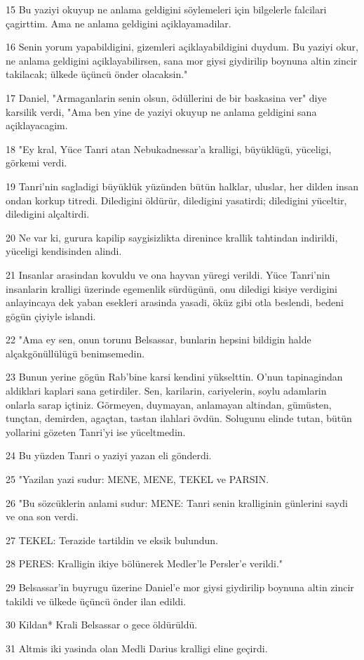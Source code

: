 \par 15 Bu yaziyi okuyup ne anlama geldigini söylemeleri için bilgelerle falcilari çagirttim. Ama ne anlama geldigini açiklayamadilar.
\par 16 Senin yorum yapabildigini, gizemleri açiklayabildigini duydum. Bu yaziyi okur, ne anlama geldigini açiklayabilirsen, sana mor giysi giydirilip boynuna altin zincir takilacak; ülkede üçüncü önder olacaksin."
\par 17 Daniel, "Armaganlarin senin olsun, ödüllerini de bir baskasina ver" diye karsilik verdi, "Ama ben yine de yaziyi okuyup ne anlama geldigini sana açiklayacagim.
\par 18 "Ey kral, Yüce Tanri atan Nebukadnessar'a kralligi, büyüklügü, yüceligi, görkemi verdi.
\par 19 Tanri'nin sagladigi büyüklük yüzünden bütün halklar, uluslar, her dilden insan ondan korkup titredi. Diledigini öldürür, diledigini yasatirdi; diledigini yüceltir, diledigini alçaltirdi.
\par 20 Ne var ki, gurura kapilip saygisizlikta direnince krallik tahtindan indirildi, yüceligi kendisinden alindi.
\par 21 Insanlar arasindan kovuldu ve ona hayvan yüregi verildi. Yüce Tanri'nin insanlarin kralligi üzerinde egemenlik sürdügünü, onu diledigi kisiye verdigini anlayincaya dek yaban esekleri arasinda yasadi, öküz gibi otla beslendi, bedeni gögün çiyiyle islandi.
\par 22 "Ama ey sen, onun torunu Belsassar, bunlarin hepsini bildigin halde alçakgönüllülügü benimsemedin.
\par 23 Bunun yerine gögün Rab'bine karsi kendini yükselttin. O'nun tapinagindan aldiklari kaplari sana getirdiler. Sen, karilarin, cariyelerin, soylu adamlarin onlarla sarap içtiniz. Görmeyen, duymayan, anlamayan altindan, gümüsten, tunçtan, demirden, agaçtan, tastan ilahlari övdün. Solugunu elinde tutan, bütün yollarini gözeten Tanri'yi ise yüceltmedin.
\par 24 Bu yüzden Tanri o yaziyi yazan eli gönderdi.
\par 25 "Yazilan yazi sudur: MENE, MENE, TEKEL ve PARSIN.
\par 26 "Bu sözcüklerin anlami sudur: MENE: Tanri senin kralliginin günlerini saydi ve ona son verdi.
\par 27 TEKEL: Terazide tartildin ve eksik bulundun.
\par 28 PERES: Kralligin ikiye bölünerek Medler'le Persler'e verildi."
\par 29 Belsassar'in buyrugu üzerine Daniel'e mor giysi giydirilip boynuna altin zincir takildi ve ülkede üçüncü önder ilan edildi.
\par 30 Kildan* Krali Belsassar o gece öldürüldü.
\par 31 Altmis iki yasinda olan Medli Darius kralligi eline geçirdi.

